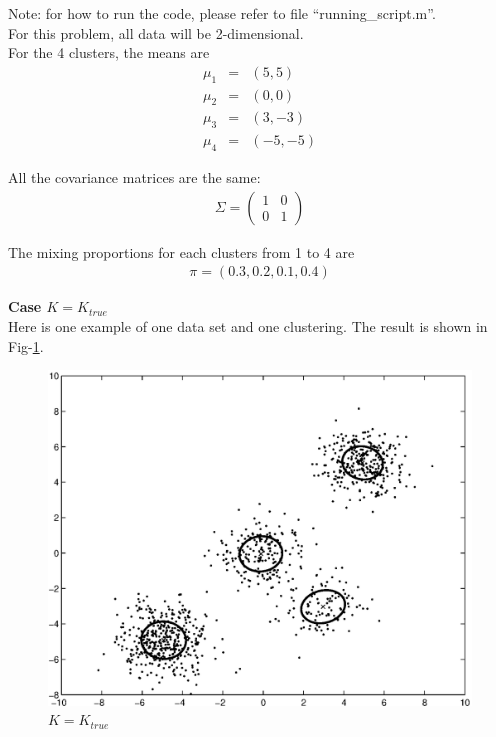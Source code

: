 \documentclass[12pt]{article}
\begin{document}
Note: for how to run the code, please refer to file ``running\_script.m''. \\

For this problem, all data will be 2-dimensional. \\

For the 4 clusters, the means are
\begin{eqnarray*}
  \mu_1 &=& (5, 5) \\
  \mu_2 &=& (0, 0) \\
  \mu_3 &=& (3, -3) \\
  \mu_4 &=& (-5, -5)
\end{eqnarray*}

All the covariance matrices are the same:
\begin{eqnarray*}
  \Sigma =
  \begin{pmatrix}
    1 & 0 \\
    0 & 1
  \end{pmatrix}
\end{eqnarray*}

The mixing proportions for each clusters from 1 to 4 are
\begin{eqnarray*}
  \pi = (0.3, 0.2, 0.1, 0.4)
\end{eqnarray*}

\textbf{Case $K = K_{true}$} \\

Here is one example of one data set and one clustering. The result is shown in Fig-\ref{fig:c1}. \\

\begin{figure}[ht!]
  \centering
  \includegraphics[width=0.7 \textwidth]{c1}
  \caption{$K = K_{true}$ \label{fig:c1}}
\end{figure}
\end{document}

